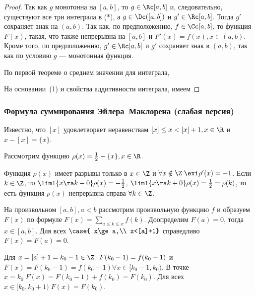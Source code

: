 \documentclass[a4paper]{article}
\begin{document}
\begin{proof}
Так как $g$ монотонна на $[a,b]$, то $g\in\Rc[a,b]$ и,
следовательно, существуют все три интеграла в (*), а
$g\in\Dc([a,b])$ и $g'\in\Rc[a,b]$. Тогда $g'$ сохраняет знак на
$(a,b)$. Так как, по предположению, $f\in\Cc[a,b]$, то функция
$F(x)$, такая, что  также непрерывна на $[a,b]$ и
$F'(x)=f(x), x\in(a,b)$. Кроме того, по предположению,
$g'\in\Rc[a,b]$ и $g'$ сохраняет знак в $(a,b)$, так как по условию
$g$ --- монотонная функция.

По первой теореме о среднем значении для интеграла,

На основании~(1) и свойства аддитивности интеграла, имеем
\end{proof}

\subsubsection{Формула суммирования Эйлера--Маклорена (слабая версия)}

Известно, что $[x]$ удовлетворяет неравенствам $[x]\le x < [x]+1,
x\in\R$ и $x-[x]=\{x\}$.

Рассмотрим функцию $\rho(x)=\frac12-\{x\},x\in\R$.

Функция $\rho(x)$ имеет разрывы только в $x\in\Z$ и $\forall
x\notin\Z\;\exi  \rho'(x)=-1$. Если $k\in\Z$, то
$\liml{x\ra k-0} \rho(x)=-\frac12$, $\liml{x\ra k+0}
\rho(x)=\frac12=\rho(k)$, то есть функция $\rho(x)$ непрерывна
справа $\forall k\in\Z$.

На произвольном $[a,b], a<b$ рассмотрим произвольную функцию $f$ и
образуем $F(x)$ по формуле $F(x)=\sum\limits_{a\le k \le x} f(k)$.
Доопределим $F(a)=0$, тогда $x\in[a,b]$. Для всех $\case{ x\ge a,\\
x<[a]+1}$ справедливо $F(x)=F(a)=0$.

Для $x=[a]+1=k_0-1\in\Z\colon F(k_0-1)=f(k_0-1)$ и
$F(x)=F(k_0-1)=f(k_0-1) \forall x\in[k_0-1,k_0)$. В точке $x=k_0\;
F(x)=F(k_0-1) + f(k_0) = F(k_0)$. Для всех $x\in[k_0,k_0+1)\;
F(x)=F(k_0)$.
\end{document}
